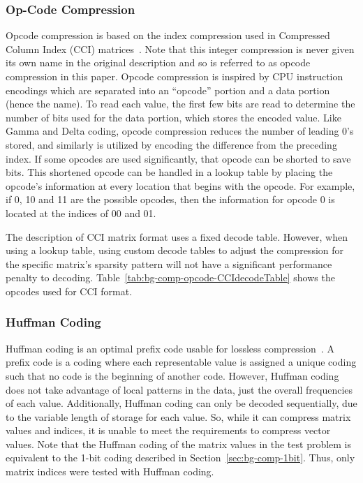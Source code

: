 \subsubsection{Op-Code Compression}
\label{sec:bg-comp-opcode}
Opcode compression is based on the index compression used in Compressed Column Index (CCI) matrices~\cite{Lawlor:2013:compression}.
Note that this integer compression is never given its own name in the original description and so is referred to as opcode compression in this paper.
Opcode compression is inspired by CPU instruction encodings which are separated into an ``opcode'' portion and a data portion (hence the name).
To read each value, the first few bits are read to determine the number of bits used for the data portion, which stores the encoded value.
Like Gamma and Delta coding, opcode compression reduces the number of leading 0's stored, and similarly is utilized by encoding the difference from the preceding index.
If some opcodes are used significantly, that opcode can be shorted to save bits.
This shortened opcode can be handled in a lookup table by placing the opcode's information at every location that begins with the opcode.
For example, if 0, 10 and 11 are the possible opcodes, then the information for opcode 0 is located at the indices of 00 and 01.

The description of CCI matrix format uses a fixed decode table.
However, when using a lookup table, using custom decode tables to adjust the compression for the specific matrix's sparsity pattern will not have a significant performance penalty to decoding.
Table~\ref{tab:bg-comp-opcode-CCIdecodeTable} shows the opcodes used for CCI format.



\subsubsection{Huffman Coding}
\label{sec:bg-comp-huffman}
Huffman coding is an optimal prefix code usable for lossless compression~\cite{Huffman:1952:coding}.
A prefix code is a coding where each representable value is assigned a unique coding such that no code is the beginning of another code.
However, Huffman coding does not take advantage of local patterns in the data, just the overall frequencies of each value.
Additionally, Huffman coding can only be decoded sequentially, due to the variable length of storage for each value.
So, while it can compress matrix values and indices, it is unable to meet the requirements to compress vector values.
Note that the Huffman coding of the matrix values in the test problem is equivalent to the 1-bit coding described in Section~\ref{sec:bg-comp-1bit}.
Thus, only matrix indices were tested with Huffman coding.


